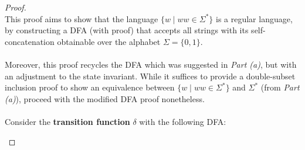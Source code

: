 \documentclass[12pt]{article}
\begin{document}
\begin{proof}
\leavevmode\\
    This proof aims to show that the language $\{ w \mid ww \in \Sigma^* \}$ is a regular language, by constructing a DFA (with proof) that accepts all strings with its self-concatenation obtainable over the alphabet $\Sigma = \{0, 1\}$. \\
    \\
    Moreover, this proof recycles the DFA which was suggested in \textit{Part (a)}, but with an adjustment to the state invariant. While it suffices to provide a double-subset inclusion proof to show an equivalence between $\{ w \mid ww \in \Sigma^* \}$ and $\Sigma^*$ (from \textit{Part (a)}), proceed with the modified DFA proof nonetheless. \\
    \\
    Consider the \textbf{transition function} $\delta$ with the following DFA:
    \begin{center}
\end{center}
\end{proof}
\end{document}
